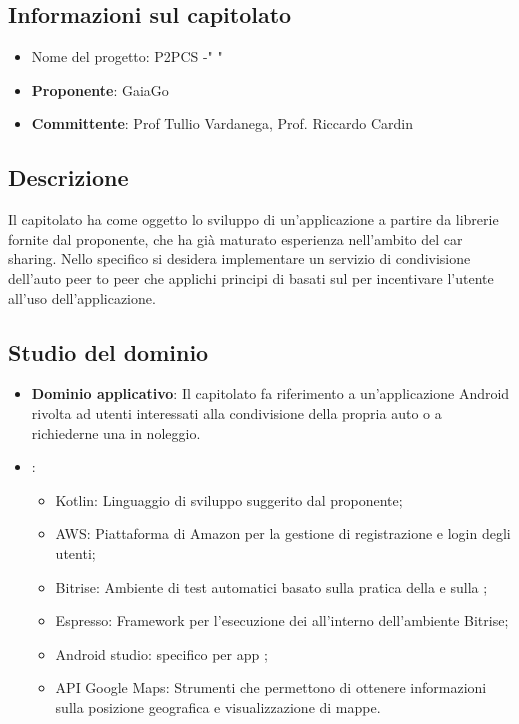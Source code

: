 \subsection{Informazioni sul capitolato}
    \begin{itemize}
        \item Nome del progetto:  P2PCS -" "
        \item \textbf{Proponente}: GaiaGo
        \item \textbf{Committente}: Prof Tullio Vardanega, Prof. Riccardo Cardin
    \end{itemize}
\subsection{Descrizione}
Il capitolato ha come oggetto lo sviluppo di un'applicazione  a partire da librerie fornite dal proponente, che ha già maturato esperienza nell'ambito del car sharing.
Nello specifico si desidera implementare un servizio di condivisione dell'auto peer to peer che applichi principi di  basati sul   per incentivare l'utente all'uso dell'applicazione.

\subsection{Studio del dominio}
     \begin{itemize}
        \item \textbf{Dominio applicativo}: Il capitolato fa riferimento a un'applicazione Android rivolta ad utenti interessati alla condivisione della propria auto o a richiederne una in noleggio.
        \item {}:
            \begin{itemize}
                \item Kotlin: Linguaggio di sviluppo suggerito dal proponente;
                \item AWS: Piattaforma  di Amazon per la gestione di registrazione e login degli utenti;
                \item Bitrise: Ambiente di test automatici basato sulla pratica della  e sulla ;
                \item Espresso: Framework per l'esecuzione dei  all'interno dell'ambiente Bitrise;
                \item Android studio:  specifico per app ;
                \item API Google Maps: Strumenti che permettono di ottenere informazioni sulla posizione geografica e visualizzazione di mappe.
            \end{itemize}
    \end{itemize}

